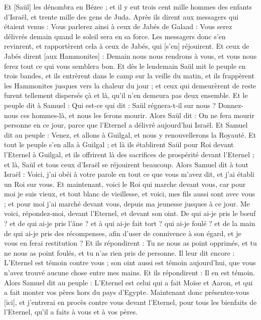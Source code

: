 \begin{multicols}{2}
Et [Saül] les dénombra en Bézec ; et il y eut trois cent mille hommes des enfants d'Israël, et trente mille des gens de Juda.
Après ils dirent aux messagers qui étaient venus : Vous parlerez ainsi à ceux de Jabés de Galaad : Vous serez délivrés demain quand le soleil sera en sa force. Les messagers donc s'en revinrent, et rapportèrent cela à ceux de Jabés, qui [s'en] réjouirent.
Et ceux de Jabés dirent [aux Hammonites] : Demain nous nous rendrons à vous, et vous nous ferez tout ce qui vous semblera bon.
Et dès le lendemain Saül mit le peuple en trois bandes, et ils entrèrent dans le camp sur la veille du matin, et ils frappèrent les Hammonites jusques vers la chaleur du jour ; et ceux qui demeurèrent de reste furent tellement dispersés çà et là, qu'il n'en demeura pas deux ensemble.
Et le peuple dit à Samuel : Qui est-ce qui dit : Saül régnera-t-il sur nous ? Donnez-nous ces hommes-là, et nous les ferons mourir.
Alors Saül dit : On ne fera mourir personne en ce jour, parce que l'Eternel a délivré aujourd'hui Israël.
Et Samuel dit au peuple : Venez, et allons à Guilgal, et nous y renouvellerons la Royauté.
Et tout le peuple s'en alla à Guilgal ; et là ils établirent Saül pour Roi devant l'Eternel à Guilgal, et ils offrirent là des sacrifices de prospérité devant l'Eternel ; et là, Saül et tous ceux d'Israël se réjouirent beaucoup.
\VerseOne{}Alors Samuel dit à tout Israël : Voici, j'ai obéi à votre parole en tout ce que vous m'avez dit, et j'ai établi un Roi sur vous.
Et maintenant, voici le Roi qui marche devant vous, car pour moi je suis vieux, et tout blanc de vieillesse, et voici, mes fils aussi sont avec vous ; et pour moi j'ai marché devant vous, depuis ma jeunesse jusques à ce jour.
Me voici, répondez-moi, devant l'Eternel, et devant son oint. De qui ai-je pris le bœuf ? et de qui ai-je pris l'âne ? et à qui ai-je fait tort ? qui ai-je foulé ? et de la main de qui ai-je pris des récompenses, afin d'user de connivence à son égard, et je vous en ferai restitution ?
Et ils répondirent : Tu ne nous as point opprimés, et tu ne nous as point foulés, et tu n'as rien pris de personne.
Il leur dit encore : L'Eternel est témoin contre vous ; son oint aussi est témoin aujourd'hui, que vous n'avez trouvé aucune chose entre mes mains. Et ils répondirent : Il en est témoin.
Alors Samuel dit au peuple : L'Eternel est celui qui a fait Moïse et Aaron, et qui a fait monter vos pères hors du pays d'Egypte.
Maintenant donc présentez-vous [ici], et j'entrerai en procès contre vous devant l'Eternel, pour tous les bienfaits de l'Eternel, qu'il a faits à vous et à vos pères.

\end{multicols}
